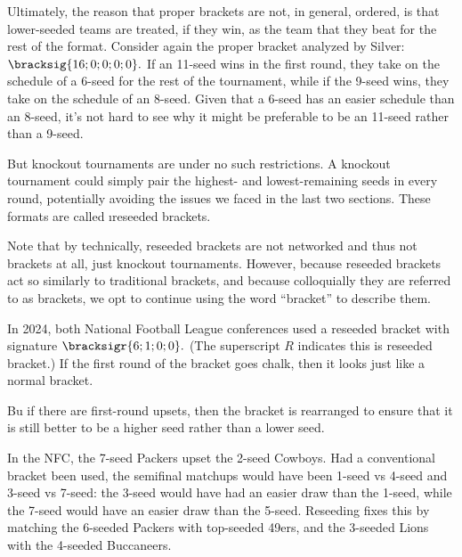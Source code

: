 {    Ultimately, the reason that proper brackets are not, in general, ordered, is that lower-seeded teams are treated, if they win, as the team that they beat for the rest of the format. Consider again the proper bracket analyzed by Silver: $\bracksig{16; 0; 0; 0; 0}.$ If an 11-seed wins in the first round, they take on the schedule of a 6-seed for the rest of the tournament, while if the 9-seed wins, they take on the schedule of an 8-seed. Given that a 6-seed has an easier schedule than an 8-seed, it's not hard to see why it might be preferable to be an 11-seed rather than a 9-seed.

    But knockout tournaments are under no such restrictions. A knockout tournament could simply pair the highest- and lowest-remaining seeds in every round, potentially avoiding the issues we faced in the last two sections. These formats are called \i{reseeded brackets}.


    Note that by technically, reseeded brackets are not networked and thus not brackets at all, just knockout tournaments. However, because reseeded brackets act so similarly to traditional brackets, and because colloquially they are referred to as brackets, we opt to continue using the word ``bracket'' to describe them.

    In 2024, both National Football League conferences \cite{wiki_nfl} used a reseeded bracket with signature $\bracksigr{6; 1; 0; 0}.$ (The superscript $R$ indicates this is reseeded bracket.) If the first round of the bracket goes chalk, then it looks just like a normal bracket.


    Bu if there are first-round upsets, then the bracket is rearranged to ensure that it is still better to be a higher seed rather than a lower seed.


    In the NFC, the 7-seed Packers upset the 2-seed Cowboys. Had a conventional bracket been used, the semifinal matchups would have been 1-seed vs 4-seed and 3-seed vs 7-seed: the 3-seed would have had an easier draw than the 1-seed, while the 7-seed would have an easier draw than the 5-seed. Reseeding fixes this by matching the 6-seeded Packers with top-seeded 49ers, and the 3-seeded Lions with the 4-seeded Buccaneers.

}

